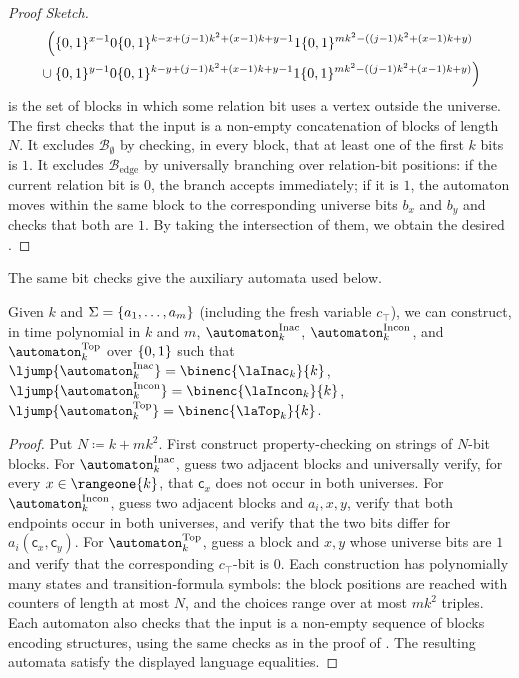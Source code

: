 \documentclass[a4paper,UKenglish,cleveref, autoref, thm-restate]{lipics-v2021}
\DeclarePairedDelimiter\set{\{}{\}}
\newcommand{\const}[1]{\mathsf{#1}}
\newcommand{\defeq}{\coloneq}
\newcommand{\vsig}{\Sigma}
\begin{document}
\begin{proof}[Proof Sketch]
\begin{align*}
        \Big(&
        \set{0,1}^{x-1}0
        \set{0,1}^{k-x+(j-1)k^2+(x-1)k+y-1}
        1
        \set{0,1}^{mk^2-((j-1)k^2+(x-1)k+y)}
        \\
        {}\cup{}&
        \set{0,1}^{y-1}0
        \set{0,1}^{k-y+(j-1)k^2+(x-1)k+y-1}
        1
        \set{0,1}^{mk^2-((j-1)k^2+(x-1)k+y)}
        \Big)
    \end{align*}
    is the set of blocks in which some relation bit uses a vertex outside the universe.
    The  first checks that the input is a non-empty concatenation of blocks of length $N$.
    It excludes $\mathcal{B}_{\emptyset}$ by checking, in every block, that at least one of the first $k$ bits is $1$.
    It excludes $\mathcal{B}_{\mathrm{edge}}$ by universally branching over relation-bit positions:
    if the current relation bit is $0$, the branch accepts immediately;
    if it is $1$, the automaton moves within the same block to the corresponding universe bits $b_x$ and $b_y$ and checks that both are $1$.
    By taking the intersection of them, we obtain the desired .
\end{proof}

The same bit checks give the auxiliary automata used below.
\begin{lemma}\label{lemma: binary auxiliary languages}
Given $k$ and $\vsig=\set{a_1,\dots,a_m}$ (including the fresh variable $c_{\top}$),
we can construct, in time polynomial in $k$ and $m$, 
$\automaton_k^{\mathrm{Inac}}$, $\automaton_k^{\mathrm{Incon}}$, and
$\automaton_k^{\mathrm{Top}}$ over $\set{0,1}$ such that
$\ljump{\automaton_k^{\mathrm{Inac}}}=\binenc{\laInac_k}{k}$,
$\ljump{\automaton_k^{\mathrm{Incon}}}=\binenc{\laIncon_k}{k}$,
$\ljump{\automaton_k^{\mathrm{Top}}}=\binenc{\laTop_k}{k}$.
\end{lemma}
\begin{proof}
Put $N\defeq k+mk^2$.
First construct property-checking  on strings of $N$-bit blocks.
For $\automaton_k^{\mathrm{Inac}}$, guess two adjacent blocks and universally verify,
for every $x\in\rangeone{k}$, that $\const{c}_x$ does not occur in both universes.
For $\automaton_k^{\mathrm{Incon}}$, guess two adjacent blocks and $a_i,x,y$,
verify that both endpoints occur in both universes, and verify that the two bits differ for
$a_i(\const{c}_x,\const{c}_y)$.
For $\automaton_k^{\mathrm{Top}}$, guess a block and $x,y$ whose universe bits are $1$
and verify that the corresponding $c_{\top}$-bit is $0$.
Each construction has polynomially many states and transition-formula symbols:
the block positions are reached with counters of length at most $N$, and the choices range over
at most $m k^2$ triples.
Each automaton also checks that the input is a non-empty sequence of blocks encoding
structures, using the same checks as in the proof of .
The resulting automata satisfy the displayed language equalities.
\end{proof}
\end{document}
